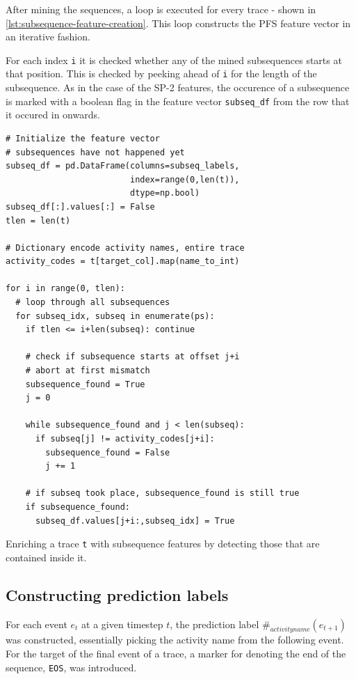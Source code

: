 After mining the sequences, a loop is executed for every trace - shown in \autoref{lst:subsequence-feature-creation}. This loop constructs the PFS feature vector in an iterative fashion.

For each index \verb=i= it is checked whether any of the mined subsequences starts at that position. This is checked by peeking ahead of \verb=i= for the length of the subsequence. As in the case of the SP-2 features, the occurence of a subsequence is marked with a boolean flag in the feature vector \verb=subseq_df= from the row that it occured in onwards.

\begin{listing}[ht]
\begin{verbatim}
# Initialize the feature vector
# subsequences have not happened yet
subseq_df = pd.DataFrame(columns=subseq_labels,
                         index=range(0,len(t)),
                         dtype=np.bool)
subseq_df[:].values[:] = False
tlen = len(t)

# Dictionary encode activity names, entire trace
activity_codes = t[target_col].map(name_to_int)

for i in range(0, tlen):
  # loop through all subsequences
  for subseq_idx, subseq in enumerate(ps):
    if tlen <= i+len(subseq): continue

    # check if subsequence starts at offset j+i
    # abort at first mismatch
    subsequence_found = True
    j = 0

    while subsequence_found and j < len(subseq):
      if subseq[j] != activity_codes[j+i]:
        subsequence_found = False
        j += 1

    # if subseq took place, subsequence_found is still true
    if subsequence_found:
      subseq_df.values[j+i:,subseq_idx] = True
\end{verbatim}
\caption{Enriching a trace \texttt{t} with subsequence features by detecting those that are contained inside it.}
\label{lst:subsequence-feature-creation}
\end{listing}

\subsection*{Constructing prediction labels}
For each event $e_t$ at a given timestep $t$, the prediction label $\#_{activity name}(e_{t+1})$ was constructed, essentially picking the activity name from the following event. For the target of the final event of a trace, a marker for denoting the end of the sequence, \verb=EOS=, was introduced.

